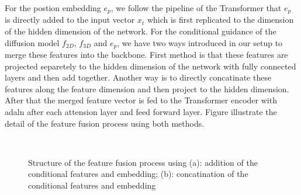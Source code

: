 \documentclass[12pt,DIV14,BCOR12mm,a4paper,footinclude=false,headinclude,parskip=half-,twoside,openright,cleardoublepage=empty,toc=index,bibliography=totoc,listof=totoc]{scrreprt}
\numberwithin{equation}{chapter}
\begin{document}
For the postion embedding $e_{p}$, we follow the pipeline of the Transformer that $e_{p}$ is directly added to the input vector $x_{t}$ which is first replicated to the dimension of the hidden dimension of the network. For the conditional guidance of the diffusion model $f_{2D}$, $f_{3D}$ and $e_{p}$, we have two ways introduced in our setup to merge these features into the backbone. First method is that these features are projected separetely to the hidden dimension of the network with fully connected layers and then add together. Another way is to directly concatinate these features along the feature dimension and then project to the hidden dimension. After that the merged feature vector is fed to the Transformer encoder with \gls{adaln} after each attension layer and feed forward layer. Figure illustrate the detail of the feature fusion process using both methods.
\begin{figure}[h]
  \centering
   \\
  \centering
  \caption{Structure of the feature fusion process using (a): addition of the conditional features and embedding; (b): concatination of the conditional features and embedding}
  \label{img:fuse}
\end{figure}
\end{document}
